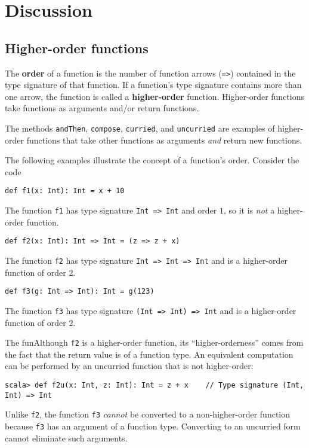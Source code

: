 \section{Discussion}

\subsection{Higher-order functions}

The \textbf{order} of a function is the
number of function arrows (\lstinline!=>!) contained in the type
signature of that function. If a function's type signature contains
more than one arrow, the function is called a \textbf{higher-order}
function. Higher-order functions take functions as arguments and/or
return functions.

The methods \lstinline!andThen!, \lstinline!compose!, \lstinline!curried!,
and \lstinline!uncurried! are examples of higher-order functions
that take other functions as arguments \emph{and} return new functions.

The following examples illustrate the concept of a function's order.
Consider the code
\begin{lstlisting}
def f1(x: Int): Int = x + 10
\end{lstlisting}
The function \texttt{}\lstinline!f1! has type signature \texttt{}\lstinline!Int => Int!
and order $1$, so it is \emph{not} a higher-order function.
\begin{lstlisting}
def f2(x: Int): Int => Int = (z => z + x)
\end{lstlisting}
The function \texttt{}\lstinline!f2! has type signature \texttt{}\lstinline!Int => Int => Int!
and is a higher-order function of order $2$. 
\begin{lstlisting}
def f3(g: Int => Int): Int = g(123)
\end{lstlisting}
The function \texttt{}\lstinline!f3! has type signature \texttt{}\lstinline!(Int => Int) => Int!
and is a higher-order function of order $2$.

The funAlthough \texttt{}\lstinline!f2! is a higher-order function,
its ``higher-orderness'' comes from the fact that the return value
is of a function type. An equivalent computation can be performed
by an uncurried function that is not higher-order:
\begin{lstlisting}
scala> def f2u(x: Int, z: Int): Int = z + x    // Type signature (Int, Int) => Int
\end{lstlisting}
Unlike \lstinline!f2!, the function \lstinline!f3! \emph{cannot}
be converted to a non-higher-order function because \lstinline!f3!
has an argument of a function type. Converting to an uncurried form
cannot eliminate such arguments.

